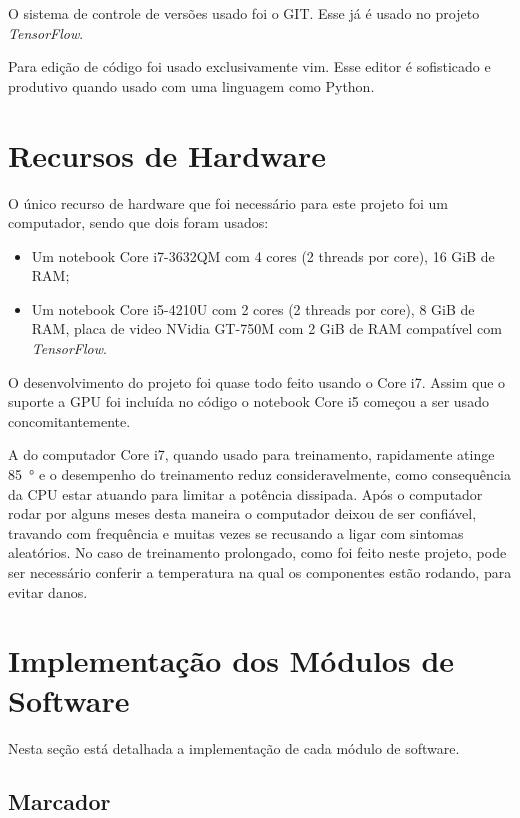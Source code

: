 O sistema de controle de versões usado foi o GIT.
Esse 
já é usado no projeto \emph{TensorFlow}.

Para edição de código foi usado exclusivamente vim. Esse editor é sofisticado
e produtivo quando usado com uma linguagem como Python.

\section{Recursos de Hardware}

O único recurso de hardware que foi necessário para este projeto foi
um computador, sendo que dois foram usados:

\begin{itemize}
\item Um notebook Core i7-3632QM com 4 cores (2 threads por core), 16 GiB
	de RAM;
\item Um notebook Core i5-4210U com 2 cores (2 threads por core), 8 GiB de RAM,
	placa de video NVidia GT-750M com 2 GiB de RAM compatível com
	\emph{TensorFlow}.
\end{itemize}

O desenvolvimento do projeto foi quase todo feito usando o Core i7. Assim que
o suporte a GPU foi incluída no código o notebook Core i5 começou a ser usado
concomitantemente.

A  do computador Core i7, quando usado para treinamento, rapidamente
atinge \SI{85}{\degree} e o desempenho do treinamento reduz consideravelmente,
como consequência da CPU estar atuando para limitar a potência dissipada. Após
o computador rodar por alguns meses desta maneira o computador deixou de ser
confiável, travando com frequência e muitas vezes se recusando a ligar com
sintomas aleatórios. No caso de treinamento prolongado, como foi feito neste
projeto, pode ser necessário conferir a temperatura na qual os componentes
estão rodando, para evitar danos.

\section{Implementação dos Módulos de Software}

Nesta seção está detalhada a implementação de cada módulo de software.

\subsection{Marcador}

